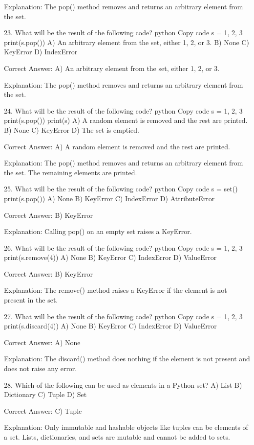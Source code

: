 Explanation:
The pop() method removes and returns an arbitrary element from the set.

23. What will be the result of the following code?
python
Copy code
s = {1, 2, 3}
print(s.pop())
A) An arbitrary element from the set, either 1, 2, or 3.
B) None
C) KeyError
D) IndexError

Correct Answer: A) An arbitrary element from the set, either 1, 2, or 3.

Explanation:
The pop() method removes and returns an arbitrary element from the set.

24. What will be the result of the following code?
python
Copy code
s = {1, 2, 3}
print(s.pop())
print(s)
A) A random element is removed and the rest are printed.
B) None
C) KeyError
D) The set is emptied.

Correct Answer: A) A random element is removed and the rest are printed.

Explanation:
The pop() method removes and returns an arbitrary element from the set. The remaining elements are printed.

25. What will be the result of the following code?
python
Copy code
s = set()
print(s.pop())
A) None
B) KeyError
C) IndexError
D) AttributeError

Correct Answer: B) KeyError

Explanation:
Calling pop() on an empty set raises a KeyError.

26. What will be the result of the following code?
python
Copy code
s = {1, 2, 3}
print(s.remove(4))
A) None
B) KeyError
C) IndexError
D) ValueError

Correct Answer: B) KeyError

Explanation:
The remove() method raises a KeyError if the element is not present in the set.

27. What will be the result of the following code?
python
Copy code
s = {1, 2, 3}
print(s.discard(4))
A) None
B) KeyError
C) IndexError
D) ValueError

Correct Answer: A) None

Explanation:
The discard() method does nothing if the element is not present and does not raise any error.

28. Which of the following can be used as elements in a Python set?
A) List
B) Dictionary
C) Tuple
D) Set

Correct Answer: C) Tuple

Explanation:
Only immutable and hashable objects like tuples can be elements of a set. Lists, dictionaries, and sets are mutable and cannot be added to sets.

